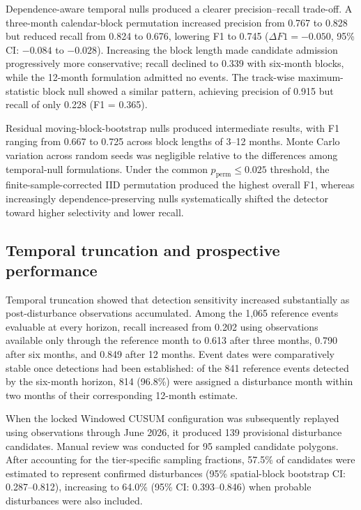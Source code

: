 Dependence-aware temporal nulls produced a clearer precision--recall trade-off. A three-month calendar-block permutation increased precision from 0.767 to 0.828 but reduced recall from 0.824 to 0.676, lowering F1 to 0.745 ($\Delta F1=-0.050$, 95\% CI: $-0.084$ to $-0.028$). Increasing the block length made candidate admission progressively more conservative; recall declined to 0.339 with six-month blocks, while the 12-month formulation admitted no events. The track-wise maximum-statistic block null showed a similar pattern, achieving precision of 0.915 but recall of only 0.228 (F1 = 0.365).

Residual moving-block-bootstrap nulls produced intermediate results, with F1 ranging from 0.667 to 0.725 across block lengths of 3--12 months. Monte Carlo variation across random seeds was negligible relative to the differences among temporal-null formulations. Under the common $p_{\mathrm{perm}}\leq0.025$ threshold, the finite-sample-corrected IID permutation produced the highest overall F1, whereas increasingly dependence-preserving nulls systematically shifted the detector toward higher selectivity and lower recall.

\subsection{Temporal truncation and prospective performance}
Temporal truncation showed that detection sensitivity increased substantially as post-disturbance observations accumulated. Among the 1,065 reference events evaluable at every horizon, recall increased from 0.202 using observations available only through the reference month to 0.613 after three months, 0.790 after six months, and 0.849 after 12 months. Event dates were comparatively stable once detections had been established: of the 841 reference events detected by the six-month horizon, 814 (96.8\%) were assigned a disturbance month within two months of their corresponding 12-month estimate.

When the locked Windowed CUSUM configuration was subsequently replayed using observations through June 2026, it produced 139 provisional disturbance candidates. Manual review was conducted for 95 sampled candidate polygons. After accounting for the tier-specific sampling fractions, 57.5\% of candidates were estimated to represent confirmed disturbances (95\% spatial-block bootstrap CI: 0.287--0.812), increasing to 64.0\% (95\% CI: 0.393--0.846) when probable disturbances were also included.
\FloatBarrier

